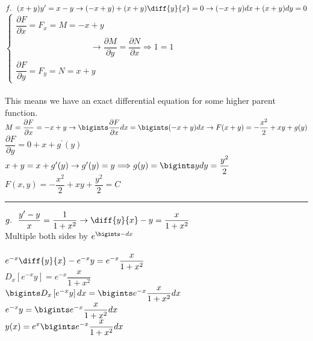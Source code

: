 \documentclass[fleqn]{article}
\begin{document}
\begin{enumerate}
      \textcolor{hwColor}{ 
        $f. ~~ (x+y)y^{\prime}=x-y \rightarrow (-x+y)+(x+y)\diff{y}{x}=0 \rightarrow (-x+y)dx+(x+y)dy=0$ \\
        $
          \begin{cases}
            \dfrac{\partial F}{\partial x}=F_x=M=-x+y \\
            ~~~~~~~~~~~~~~~~~~~~~~~~~~~~~~~~~~~~~~~~ \rightarrow \dfrac{\partial M}{\partial y}=\dfrac{\partial N}{\partial x} \Longrightarrow 1=1 \\
            \dfrac{\partial F}{\partial y}=F_y=N=x+y
          \end{cases}
        $ \\
        \\
        This means we have an exact differential equation for some higher parent function. \\
        $M=\dfrac{\partial F}{\partial x}=-x+y \rightarrow \bigints \dfrac{\partial F}{\partial x} dx=\bigints (-x+y)dx \rightarrow F(x+y)=-\dfrac{x^2}{2}+xy+g(y)$ \\
        $\dfrac{\partial F}{\partial y}=0+x+g^{\prime}(y)$ \\
        $x+y=x+g^{\prime}(y) \rightarrow g^{\prime}(y)=y \Longrightarrow g(y)=\bigints ydy=\dfrac{y^2}{2}$ \\
        $F(x,y)=-\dfrac{x^2}{2}+xy+\dfrac{y^2}{2}=C$
      }

      \textcolor{hwColor}{  
        \rule{15cm}{0.4pt}  
      }

      \textcolor{hwColor}{ 
        $g. ~~ \dfrac{y^{\prime}-y}{x}=\dfrac{1}{1+x^2} \rightarrow \diff{y}{x}-y=\dfrac{x}{1+x^2}$ \\
        Multiple both sides by $e^{\bigints -dx}$ \\
        \\
        $e^{-x} \diff{y}{x}-e^{-x}y=e^{-x}\dfrac{x}{1+x^2}$ \\
        $D_x\left[e^{-x}y\right]=e^{-x}\dfrac{x}{1+x^2}$ \\
        $\bigints D_x\left[e^{-x}y\right]dx=\bigints e^{-x}\dfrac{x}{1+x^2}dx$ \\
        $e^{-x}y=\bigints e^{-x}\dfrac{x}{1+x^2}dx$ \\
        $y(x)=e^x \bigints e^{-x}\dfrac{x}{1+x^2}dx$
      }


\end{enumerate}
\end{document}
